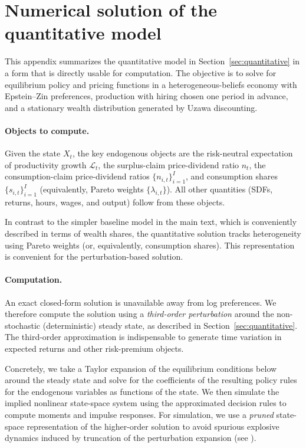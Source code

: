 \section{Numerical solution of the quantitative model}\label{app:numerical_solution}

This appendix summarizes the quantitative model in Section~\ref{sec:quantitative} in a form that is directly usable for computation.
The objective is to solve for equilibrium policy and pricing functions in a heterogeneous-beliefs economy with Epstein--Zin preferences, production with hiring chosen one period in advance, and a stationary wealth distribution generated by Uzawa discounting.

\paragraph{Objects to compute.}
Given the state \(X_t\), the key endogenous objects are the risk-neutral expectation of productivity growth \(\mathcal{L}_t\), the surplus-claim price-dividend ratio \(n_t\), the consumption-claim price-dividend ratios \(\{n_{i,t}\}_{i=1}^I\), and consumption shares \(\{s_{i,t}\}_{i=1}^I\) (equivalently, Pareto weights \(\{\lambda_{i,t}\}\)).
All other quantities (SDFs, returns, hours, wages, and output) follow from these objects.

In contrast to the simpler baseline model in the main text, which is conveniently described in terms of wealth shares, the quantitative solution tracks heterogeneity using Pareto weights (or, equivalently, consumption shares). This representation is convenient for the perturbation-based solution.

\paragraph{Computation.}
An exact closed-form solution is unavailable away from log preferences.
We therefore compute the solution using a \textit{third-order perturbation} around the non-stochastic (deterministic) steady state, as described in Section~\ref{sec:quantitative}.
The third-order approximation is indispensable to generate time variation in expected returns and other risk-premium objects.

Concretely, we take a Taylor expansion of the equilibrium conditions below around the steady state and solve for the coefficients of the resulting policy rules for the endogenous variables as functions of the state.
We then simulate the implied nonlinear state-space system using the approximated decision rules to compute moments and impulse responses. For simulation, we use a \textit{pruned} state-space representation of the higher-order solution to avoid spurious explosive dynamics induced by truncation of the perturbation expansion (see \citealt{andreasen2018pruned}).

